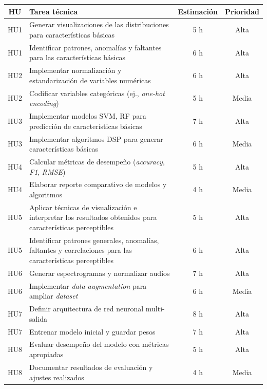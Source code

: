 \documentclass[
11pt, %
]{charter}
\begin{document}
\begin{table}[htpb]
\centering
\begin{tabularx}{\linewidth}{@{}|c|X|c|c|@{}}
\hline
\rowcolor[HTML]{C0C0C0}
HU & Tarea técnica & Estimación & Prioridad \\ \hline
HU1 & Generar visualizaciones de las distribuciones para características básicas & 5 h & Alta \\ \hline
HU1 & Identificar patrones, anomalías y faltantes para las características básicas & 6 h & Alta \\ \hline

HU2 & Implementar normalización y estandarización de variables numéricas & 6 h & Alta \\ \hline
HU2 & Codificar variables categóricas (ej., \textit{one-hot encoding}) & 5 h & Media \\ \hline

HU3 & Implementar modelos SVM, RF para predicción de características básicas & 7 h & Alta \\ \hline
HU3 & Implementar algoritmos DSP para generar características básicas & 6 h & Media \\ \hline

HU4 & Calcular métricas de desempeño (\textit{accuracy}, \textit{F1}, \textit{RMSE}) & 5 h & Alta \\ \hline
HU4 & Elaborar reporte comparativo de modelos y algoritmos & 4 h & Media \\ \hline

HU5 & Aplicar técnicas de visualización e interpretar los resultados obtenidos para características perceptibles & 5 h & Alta \\ \hline
HU5 & Identificar patrones generales, anomalías, faltantes y correlaciones para las características perceptibles & 6 h & Alta \\ \hline

HU6 & Generar espectrogramas y normalizar audios & 7 h & Alta \\ \hline
HU6 & Implementar \textit{data augmentation} para ampliar \textit{dataset} & 6 h & Media \\ \hline

HU7 & Definir arquitectura de red neuronal multi-salida & 8 h & Alta \\ \hline
HU7 & Entrenar modelo inicial y guardar pesos & 7 h & Alta \\ \hline

HU8 & Evaluar desempeño del modelo con métricas apropiadas & 5 h & Alta \\ \hline
HU8 & Documentar resultados de evaluación y ajustes realizados & 4 h & Media \\ \hline


\end{tabularx}
\end{table}
\end{document}
